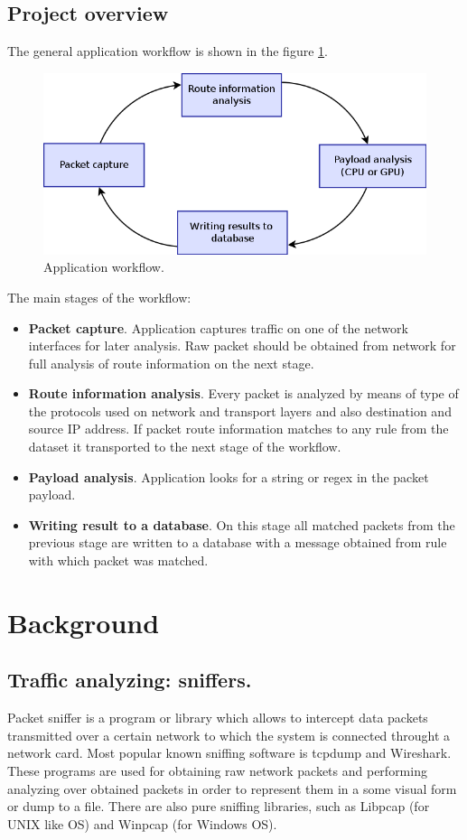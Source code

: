 \documentclass[thesis=M,english]{FITthesis}[2011/07/15]
\begin{document}
\section{Project overview}

The general application workflow is shown in the figure \ref{fig:app_workflow}.
\begin{figure}[h]
\centering
\includegraphics[scale=0.4]{images/workflow.png}
\caption{Application workflow.}
\label{fig:app_workflow}
\end{figure}

The main stages of the workflow:
\begin{itemize}
\item \textbf{Packet capture}. Application captures traffic on one of the network interfaces for later analysis. Raw packet should be obtained from network for full analysis of route information on the next stage.
\item \textbf{Route information analysis}. Every packet is analyzed by means of type of the protocols used on network and transport layers and also destination and source IP address. If packet route information matches to any rule from the dataset it transported to the next stage of the workflow.
\item \textbf{Payload analysis}. Application looks for a string or regex in the packet payload.
\item \textbf{Writing result to a database}. On this stage all matched packets from the previous stage are written to a database with a message obtained from rule with which packet was matched.
\end{itemize}

\chapter{Background}
\section{Traffic analyzing: sniffers.}
Packet sniffer is a program or library which allows to intercept data packets transmitted over a certain network to which the system is connected throught a network card. Most popular known sniffing software is tcpdump and Wireshark. These programs are used for obtaining raw network packets and performing analyzing over obtained packets in order to represent them in a some visual form or dump to a file. There are also pure sniffing libraries, such as Libpcap (for UNIX like OS) and Winpcap (for Windows OS).
\end{document}
